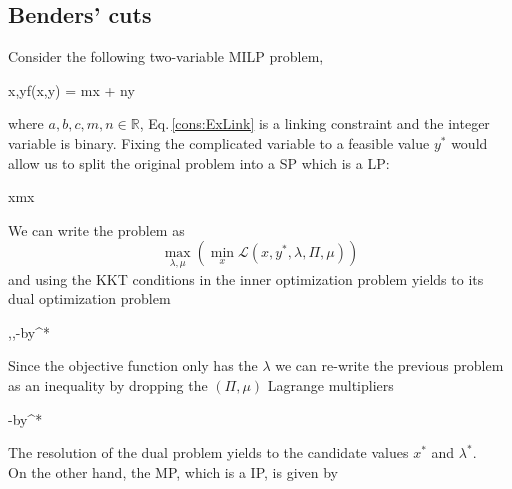 \subsection{Benders' cuts}
Consider the following two-variable MILP problem,
\begin{mini!}[2]
	{x,y}{f(x,y) = mx + ny}{}{}{\quad {}}
\end{mini!}
where $a,b,c,m,n \in \mathbb{R}$, Eq.\,\eqref{cons:ExLink} is a linking constraint and the integer variable is binary. Fixing the complicated variable to a feasible value $y^{*}$ would allow us to split the original problem into a SP which is a LP:
\begin{tcolorbox}[colback=red!5!white,colframe=red!75!black,title=Slave problem]
\begin{mini!}[2]
	{x}{\alpha \equiv mx}{}{}{}
\end{mini!}
\end{tcolorbox}
We can write the problem as
\begin{equation}
    \max_{\lambda,\mu}\left(\min_{x}\mathcal{L}(x,y^{*},\lambda,\Pi,\mu)\right)
\end{equation}
and using the KKT conditions in the inner optimization problem yields to its dual optimization problem
\begin{maxi!}[2]
	{\lambda,\Pi,\mu}{-by^{*}\lambda}{}{}{}
\end{maxi!}
Since the objective function only has the $\lambda$ we can re-write the previous problem as an inequality by dropping the $(\Pi,\mu)$ Lagrange multipliers
\begin{tcolorbox}[colback=red!5!white,colframe=red!75!black,title=Dual formulation of slave problem]
\begin{maxi!}[2]
	{\lambda}{-by^{*}\lambda}{}{}{}
\end{maxi!}
\end{tcolorbox}
The resolution of the dual problem yields to the candidate values $x^{*}$ and $\lambda^{*}$.\\
On the other hand, the MP, which is a IP, is given by
